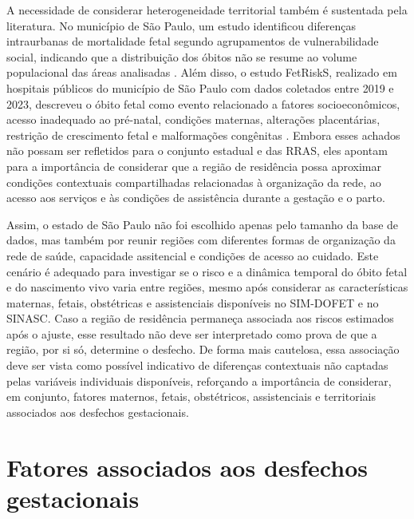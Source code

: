 A necessidade de considerar heterogeneidade territorial também é sustentada pela
literatura. No município de São Paulo, um estudo identificou diferenças
intraurbanas de mortalidade fetal segundo agrupamentos de vulnerabilidade
social, indicando que a distribuição dos óbitos não se resume ao volume
populacional das áreas analisadas \cite{Marques2021FetalSocialVulnerabilitySP}.
Além disso, o estudo FetRiskS, realizado em hospitais públicos do município de
São Paulo com dados coletados entre 2019 e 2023, descreveu o óbito fetal como
evento relacionado a fatores socioeconômicos, acesso inadequado ao pré-natal,
condições maternas, alterações placentárias, restrição de crescimento fetal e
malformações congênitas \cite{Marques2026FetRiskS}. Embora esses achados não possam 
ser refletidos para o conjunto estadual e das RRAS, eles apontam para a importância 
de considerar que a região de residência possa aproximar condições contextuais 
compartilhadas relacionadas à organização da rede, ao acesso aos serviços e às 
condições de assistência durante a gestação e o parto.

Assim, o estado de São Paulo não foi escolhido apenas pelo tamanho da base de 
dados, mas também por reunir regiões com diferentes formas de organização da 
rede de saúde, capacidade assitencial e condições de acesso ao cuidado. Este cenário 
é adequado para investigar se o risco e a dinâmica temporal do óbito fetal e do nascimento 
vivo varia entre regiões, mesmo após considerar as características maternas, fetais, 
obstétricas e assistenciais disponíveis no SIM-DOFET e no SINASC. Caso a região 
de residência permaneça associada aos riscos estimados após o ajuste, esse resultado 
não deve ser interpretado como prova de que a região, por si só, determine o 
desfecho. De forma mais cautelosa, essa associação deve ser vista como possível 
indicativo de diferenças contextuais não captadas pelas variáveis individuais 
disponíveis, reforçando a importância de considerar, em conjunto, fatores maternos, 
fetais, obstétricos, assistenciais e territoriais associados aos desfechos 
gestacionais.

\section{Fatores associados aos desfechos gestacionais}

